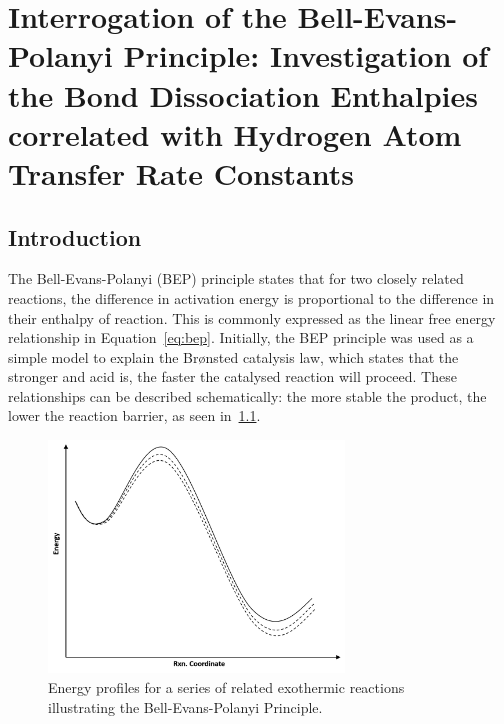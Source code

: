 
\chapter{Interrogation of the Bell-Evans-Polanyi Principle: Investigation of the
Bond Dissociation Enthalpies correlated with Hydrogen Atom Transfer Rate Constants}
\label{ch:bde}

\section{Introduction}

The Bell-Evans-Polanyi (BEP) principle states that for two closely related reactions, the difference in activation energy is proportional to the difference in their enthalpy of reaction.\cite{Bell1936,Evans1938,Dill2003} This is commonly expressed as the linear free energy relationship in Equation~\ref{eq:bep}. Initially, the BEP principle was used as a simple model to explain the Br{\o}nsted catalysis law, which states that the stronger and acid is, the faster the catalysed reaction will proceed.\cite{Bronsted1924} These relationships can be described schematically: the more stable the product, the lower the reaction barrier, as seen in~\ref{fig:bep}.

\begin{figure}[htb]
  \centering
  \includegraphics[width=0.7\textwidth]{figures/bep}
  \caption{Energy profiles for a series of related exothermic reactions illustrating the Bell-Evans-Polanyi Principle.}
\label{fig:bep}
\end{figure}

